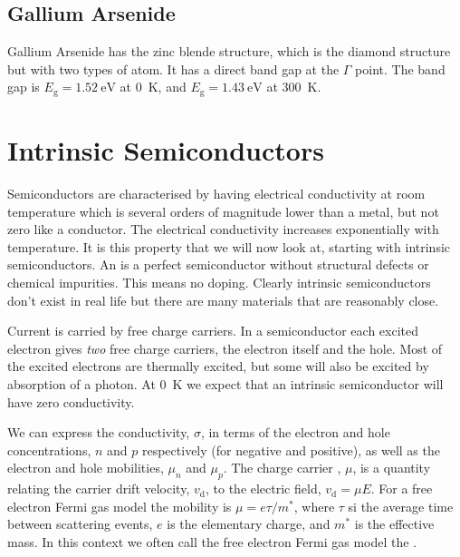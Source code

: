 \documentclass[fleqn]{NotesClass}
\begin{document}
    \subsection{Gallium Arsenide}
    Gallium Arsenide has the zinc blende structure, which is the diamond structure but with two types of atom.
    It has a direct band gap at the \(\Gamma\) point.
    The band gap is \(E_{\mathrm{g}} = \qty{1.52}{\electronvolt}\) at \qty{0}{\kelvin}, and \(E_{\mathrm{g}} = \qty{1.43}{\electronvolt}\) at \qty{300}{\kelvin}.
    
    \section{Intrinsic Semiconductors}
    Semiconductors are characterised by having electrical conductivity at room temperature which is several orders of magnitude lower than a metal, but not zero like a conductor.
    The electrical conductivity increases exponentially with temperature.
    It is this property that we will now look at, starting with intrinsic semiconductors.
    An  is a perfect semiconductor without structural defects or chemical impurities.
    This means no doping.
    Clearly intrinsic semiconductors don't exist in real life but there are many materials that are reasonably close.
    
    Current is carried by free charge carriers.
    In a semiconductor each excited electron gives \emph{two} free charge carriers, the electron itself and the hole.
    Most of the excited electrons are thermally excited, but some will also be excited by absorption of a photon.
    At \qty{0}{\kelvin} we expect that an intrinsic semiconductor will have zero conductivity.
    
    We can express the conductivity, \(\sigma\), in terms of the electron and hole concentrations, \(n\) and \(p\) respectively (for negative and positive), as well as the electron and hole mobilities, \(\mu_n\) and \(\mu_p\).
    The charge carrier , \(\mu\), is a quantity relating the carrier drift velocity, \(v_{\mathrm{d}}\), to the electric field, \(v_{\mathrm{d}} = \mu E\).
    For a free electron Fermi gas model the mobility is \(\mu = e\tau/m^*\), where \(\tau\) si the average time between scattering events, \(e\) is the elementary charge, and \(m^*\) is the effective mass.
    In this context we often call the free electron Fermi gas model the .
    
\end{document}
